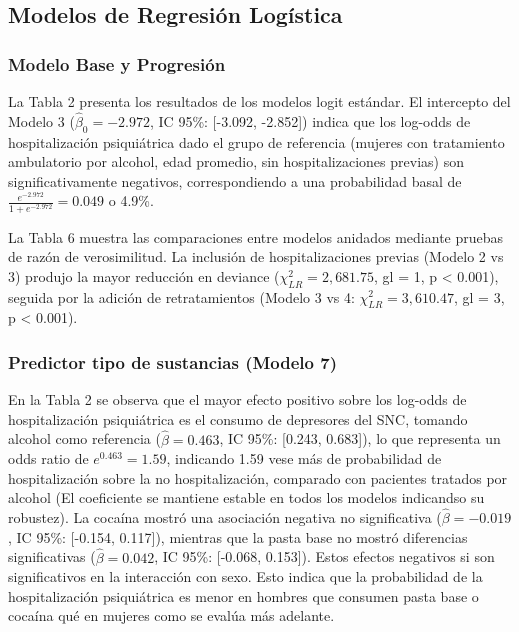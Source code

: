 \documentclass[
  spanish,
  10pt,
]{article}
\begin{document}
\subsection{Modelos de Regresión
Logística}\label{modelos-de-regresiuxf3n-loguxedstica}

\subsubsection{Modelo Base y
Progresión}\label{modelo-base-y-progresiuxf3n}

La Tabla 2 presenta los resultados de los modelos logit estándar. El
intercepto del Modelo 3 (\(\hat{\beta}_0 = -2.972\), IC 95\%: {[}-3.092,
-2.852{]}) indica que los log-odds de hospitalización psiquiátrica dado
el grupo de referencia (mujeres con tratamiento ambulatorio por alcohol,
edad promedio, sin hospitalizaciones previas) son significativamente
negativos, correspondiendo a una probabilidad basal de
\(\frac{e^{-2.972}}{1+e^{-2.972}} = 0.049\) o 4.9\%.

La Tabla 6 muestra las comparaciones entre modelos anidados mediante
pruebas de razón de verosimilitud. La inclusión de hospitalizaciones
previas (Modelo 2 vs 3) produjo la mayor reducción en deviance
(\(\chi^2_{LR} = 2,681.75\), gl = 1, p \textless{} 0.001), seguida por
la adición de retratamientos (Modelo 3 vs 4: \(\chi^2_{LR} = 3,610.47\),
gl = 3, p \textless{} 0.001).

\subsubsection{Predictor tipo de sustancias (Modelo
7)}\label{predictor-tipo-de-sustancias-modelo-7}

En la Tabla 2 se observa que el mayor efecto positivo sobre los log-odds
de hospitalización psiquiátrica es el consumo de depresores del SNC,
tomando alcohol como referencia (\(\hat{\beta} = 0.463\), IC 95\%:
{[}0.243, 0.683{]}), lo que representa un odds ratio de
\(e^{0.463} = 1.59\), indicando 1.59 vese más de probabilidad de
hospitalización sobre la no hospitalización, comparado con pacientes
tratados por alcohol (El coeficiente se mantiene estable en todos los
modelos indicandso su robustez). La cocaína mostró una asociación
negativa no significativa (\(\hat{\beta} = -0.019\), IC 95\%: {[}-0.154,
0.117{]}), mientras que la pasta base no mostró diferencias
significativas (\(\hat{\beta} = 0.042\), IC 95\%: {[}-0.068, 0.153{]}).
Estos efectos negativos si son significativos en la interacción con
sexo. Esto indica que la probabilidad de la hospitalización psiquiátrica
es menor en hombres que consumen pasta base o cocaína qué en mujeres
como se evalúa más adelante.
\end{document}
